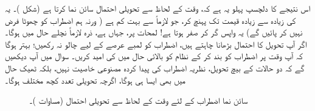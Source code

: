 اس نتیجے کا دلچسپ پہلو یہ ہے کہ،   وقت کے لحاظ سے  تحویلی  احتمال سائن نما   کرتا ہے (شکل )۔
 یہ  کی زیادہ سے زیادہ قیمت تک پہنچ کر،  جو لازماً   سے بہت کم ہے ( ورنہ ہم  اضطراب کو چھوٹا فرض نہیں کر پائیں گے)  یہ واپس  گر کر صفر ہوتا ہے!  لمحات  پر،  جہاں  ہے،  ذرہ لازماً نچلے حال میں ہوگا۔  اگر آپ تحویل  کا احتمال بڑھانا چاہتے ہیں،  اضطراب کو لمبے عرصے  کے لیے چالو نہ رکھیں؛  بہتر ہوگا کہ آپ وقت  پر اضطراب کو بند  کر کے  نظام کو بالائی حال میں   کی امید کریں۔ سوال   میں آپ دیکھیں گے کہ دو حالات کے بیچ  تحویل،  نظریہ اضطراب کی پیدا کردہ  مصنوعی خاصیت  نہیں،  بلکہ  ٹھیک حال میں بھی ایسا ہی  ہوگا،  اگرچہ  تحویلی  تعدد کچھ مختلف ہوگا۔

\begin{figure}
\centering
{}
\caption{سائن نما اضطراب کے لئے وقت کے لحاظ سے تحویلی احتمال (مساوات )۔}
\label{شکل_تابع_وقت_احتمال_سائن_نما_احتمال}
\end{figure}


